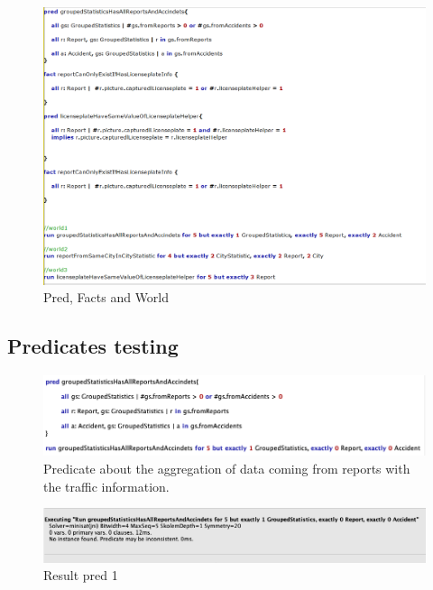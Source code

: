 \begin{figure}
	\centering
	\includegraphics[width=0.95\linewidth, height=0.86\textheight]{Images/Alloy/codealloy7}
	\caption{Pred, Facts and World}
	\label{Pred and Facts and World}
\end{figure}


\subsection{Predicates testing}
\begin{figure}
	\centering
	\includegraphics[width=0.9\linewidth, height=0.15\textheight]{Images/Alloy/test-world11}
	\caption{Predicate about the aggregation of data coming from reports with the traffic information.}
	\label{Pred 1}
\end{figure}

\begin{figure}
	\centering
	\includegraphics[width=0.9\linewidth, height=0.12\textheight]{Images/Alloy/test-world12}
	\caption{Result pred 1}
	\label{Result pred 1}
\end{figure}

